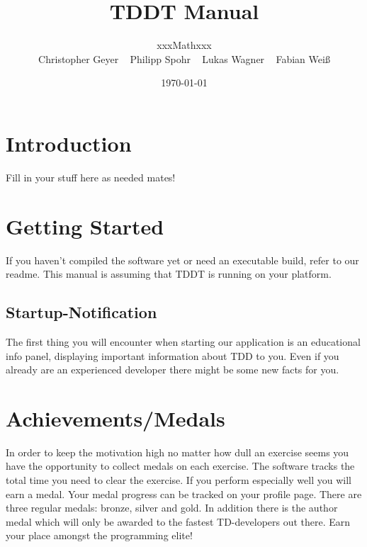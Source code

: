 \documentclass[10pt,a4paper]{article}
\begin{document}
\title{\large TDDT Manual}
\date{\small \today}
\author{\normalsize xxxMathxxx \\
Christopher Geyer ~
Philipp Spohr ~
Lukas Wagner ~
Fabian Weiß }
\maketitle
\tableofcontents
\section{Introduction}
Fill in your stuff here as needed mates!
\section{Getting Started}
If you haven't compiled the software yet or need an executable build, refer to our readme. This manual is assuming that TDDT is running on your platform.
\subsection{Startup-Notification}
The first thing you will encounter when starting our application is an educational info panel, displaying important information about TDD to you. Even if you already are an experienced developer there might be some new facts for you.
\section{Achievements/Medals}
In order to keep the motivation high no matter how dull an exercise seems you have the opportunity to
collect medals on each exercise. The software tracks the total time you need to clear the exercise. If you perform especially well you will earn
a medal. Your medal progress can be tracked on your profile page.
There are three regular medals: bronze, silver and gold. In addition there is the author medal which will only be awarded to the fastest TD-developers out there.
Earn your place amongst the programming elite!
\end{document}
